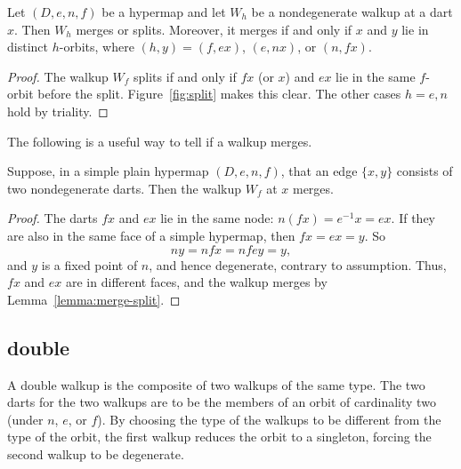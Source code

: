 \begin{lemma}\label{lemma:merge-split} 
  Let $(D,e,n,f)$ be a hypermap and let $W_h$ be a nondegenerate
  walkup at a dart $x$.  Then $W_h$ merges or splits. Moreover, it merges if
  and only if $x$ and $y$ lie in distinct $h$-orbits, where
  $(h,y)=(f,e x)$,  $(e,n x)$, or $(n,f x)$.
\end{lemma}

\begin{proof} The walkup $W_f$ splits if and only if $f x$ 
(or $x$)
and $e x$ lie in the same $f$-orbit before the split. 
Figure~\ref{fig:split} makes this clear.
The other cases $h=e,n$ hold by triality.
\end{proof}

\figILWHXTE %


The following is a useful way to tell if a walkup merges.


\begin{lemma}\label{lemma:ng-merge}  
Suppose, in a simple plain hypermap $(D,e,n,f)$, that an edge $\{x,y\}$ consists
of two nondegenerate darts.  Then the walkup $W_f$ 
at $x$ merges.
\end{lemma}
%

\begin{proof}
The darts $f x$ and $e x$ lie in the same node: $n (f x) = e^{-1} x
= e x$. If they are also in the same face of a simple hypermap, then
$f x = e x = y$. So
\[ n y = n f x = n f e y = y,\]  and $y$
is a fixed point of $n$, and hence degenerate, contrary to assumption.
Thus, $f x$ and $e x$ are in different faces, and the walkup merges by
Lemma~\ref{lemma:merge-split}.
\end{proof}


\subsection{double}
%

A double walkup is the composite of two walkups of the same type.  The
two darts for the two walkups are to be the members of an orbit of
cardinality two (under $n$, $e$, or $f$).
By choosing the type of the walkups to be different from the type of
the orbit, the first walkup reduces the orbit to a singleton, forcing
the second walkup to be degenerate.

